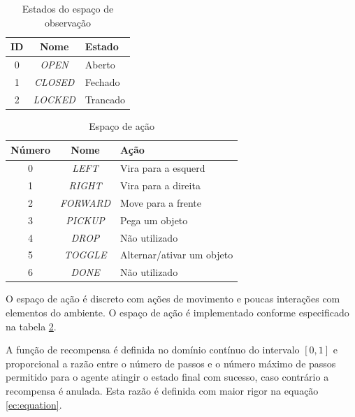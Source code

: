 \documentclass[9pt,a4paper,twoside]{tau}
\begin{document}
\begin{table}[htbp]
    \caption{Estados do espaço de observação}
    \label{tab:states}
    \centering
    \begin{tabular}{ccl}
        \toprule
        \textbf{ID} & \textbf{Nome}   & \textbf{Estado} \\
        \midrule
        0           & \textit{OPEN}   & Aberto          \\
        1           & \textit{CLOSED} & Fechado         \\
        2           & \textit{LOCKED} & Trancado        \\
        \bottomrule
    \end{tabular}
\end{table}

\begin{table}[htbp]
    \caption{Espaço de ação}
    \label{tab:actions}
    \centering
    \begin{tabular}{ccl}
        \toprule
        \textbf{Número} & \textbf{Nome}    & \textbf{Ação}             \\
        \midrule
        0               & \textit{LEFT}    & Vira para a esquerd       \\
        1               & \textit{RIGHT}   & Vira para a direita       \\
        2               & \textit{FORWARD} & Move para a frente        \\
        3               & \textit{PICKUP}  & Pega um objeto            \\
        4               & \textit{DROP}    & Não utilizado             \\
        5               & \textit{TOGGLE}  & Alternar/ativar um objeto \\
        6               & \textit{DONE}    & Não utilizado             \\
        \bottomrule
    \end{tabular}
\end{table}

O espaço de ação é discreto com ações de movimento e poucas interações com elementos do ambiente. O espaço de ação é implementado conforme especificado na tabela \ref{tab:actions}.

A função de recompensa é definida no domínio contínuo do intervalo \([0, 1]\) e proporcional a razão entre o número de passos e o número máximo de passos permitido para o agente atingir o estado final com sucesso, caso contrário a recompensa é anulada. Esta razão é definida com maior rigor na equação \ref{ec:equation}.
\end{document}
